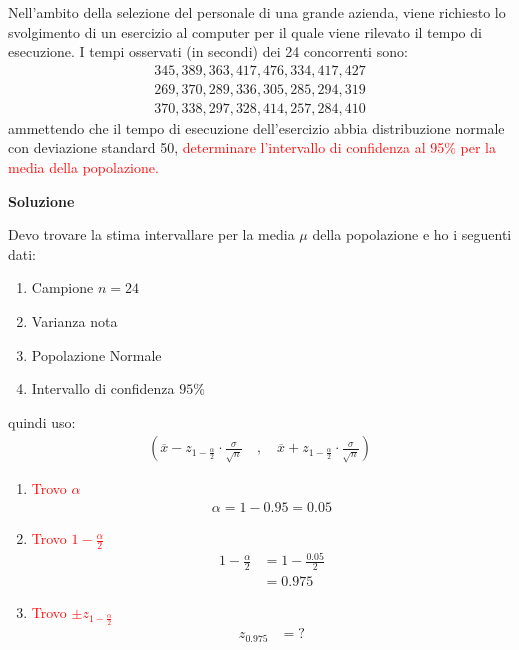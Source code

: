 \documentclass{article}  %
\theoremstyle{definition}
\begin{document}
\begin{esercizio}[Esercizio 1]
	Nell'ambito della selezione del personale di una grande azienda, viene richiesto lo svolgimento di un esercizio al computer per il quale
	viene rilevato il tempo di esecuzione. I tempi osservati (in secondi) dei 24 concorrenti sono:
	\begin{align*}
		345, 389, 363, 417, 476, 334, 417, 427 \\
		269, 370, 289, 336, 305, 285, 294, 319 \\
		370, 338, 297, 328, 414, 257, 284, 410
	\end{align*}
	ammettendo che il tempo di esecuzione dell'esercizio abbia distribuzione normale con deviazione standard 50, \textcolor{red}
	{determinare l'intervallo di confidenza al 95$\%$ per la media della popolazione.}
	\begin{center}
		\textbf{Soluzione}
	\end{center}
	Devo trovare la stima intervallare per la media $\mu$ della popolazione e ho i seguenti dati:
	\begin{enumerate}
		\item Campione $n=24$
		\item Varianza nota
		\item Popolazione Normale
		\item Intervallo di confidenza $95\%$
	\end{enumerate}
	quindi uso:
	\begin{align*}
		\left(\overline{x}-z_{1-\frac{\alpha}{2}}\cdot \frac{\sigma}{\sqrt{n}} \quad , \quad \overline{x}+z_{1-\frac{\alpha}{2}}\cdot \frac{\sigma}{\sqrt{n}}\right)
	\end{align*}
	\begin{enumerate}
		\item \textcolor{red}{Trovo $\alpha$}
		      \begin{align*}
			      \alpha = 1 - 0.95 = 0.05
		      \end{align*}
		\item \textcolor{red}{Trovo $1-\frac{\alpha}{2}$}
		      \begin{align*}
			      1-\frac{\alpha}{2} & = 1 - \frac{0.05}{2} \\
			                         & = 0.975
		      \end{align*}
		\item \textcolor{red}{Trovo $\pm z_{1- \frac{\alpha}{2}}$}
		      \begin{align*}
			      z_{0.975} & = ?                                            \\

\end{align*}
\end{enumerate}
\end{esercizio}
\end{document}
